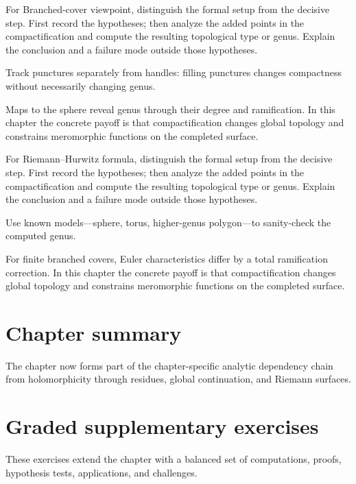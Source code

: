 \begin{exercise}\label{exr:iv26-07}
For Branched-cover viewpoint, distinguish the formal setup from the decisive step. First record the hypotheses; then analyze the added points in the compactification and compute the resulting topological type or genus. Explain the conclusion and a failure mode outside those hypotheses.
\end{exercise}
\begin{hint}
Track punctures separately from handles: filling punctures changes compactness without necessarily changing genus.
\end{hint}
\begin{solution}
Maps to the sphere reveal genus through their degree and ramification. In this chapter the concrete payoff is that compactification changes global topology and constrains meromorphic functions on the completed surface.
\end{solution}

\begin{exercise}\label{exr:iv26-08}
For Riemann--Hurwitz formula, distinguish the formal setup from the decisive step. First record the hypotheses; then analyze the added points in the compactification and compute the resulting topological type or genus. Explain the conclusion and a failure mode outside those hypotheses.
\end{exercise}
\begin{hint}
Use known models—sphere, torus, higher-genus polygon—to sanity-check the computed genus.
\end{hint}
\begin{solution}
For finite branched covers, Euler characteristics differ by a total ramification correction. In this chapter the concrete payoff is that compactification changes global topology and constrains meromorphic functions on the completed surface.
\end{solution}

\section*{Chapter summary}
The chapter now forms part of the chapter-specific analytic dependency chain from holomorphicity through residues, global continuation, and Riemann surfaces.
\section{Graded supplementary exercises}
These exercises extend the chapter with a balanced set of computations, proofs, hypothesis tests, applications, and challenges.

